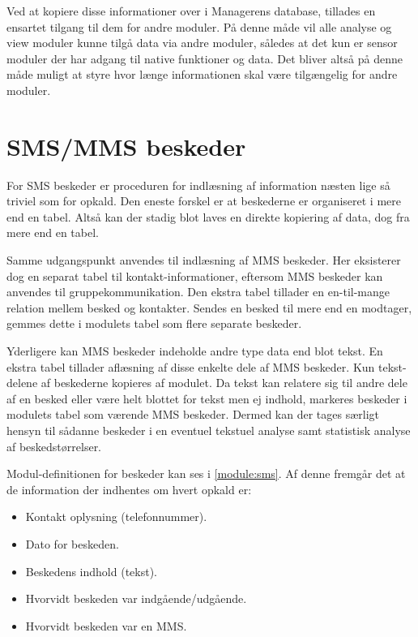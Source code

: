 Ved at kopiere disse informationer over i Managerens database, tillades en ensartet tilgang til dem for andre moduler.
På denne måde vil alle analyse og view moduler kunne tilgå data via andre moduler, således at det kun er sensor moduler der har adgang til native funktioner og data.
Det bliver altså på denne måde muligt at styre hvor længe informationen skal være tilgængelig for andre moduler.



\section{SMS/MMS beskeder}
For SMS beskeder er proceduren for indlæsning af information næsten lige så triviel som for opkald.
Den eneste forskel er at beskederne er organiseret i mere end en tabel.
Altså kan der stadig blot laves en direkte kopiering af data, dog fra mere end en tabel.

Samme udgangspunkt anvendes til indlæsning af MMS beskeder.
Her eksisterer dog en separat tabel til kontakt-informationer, eftersom MMS beskeder kan anvendes til gruppekommunikation.
Den ekstra tabel tillader en en-til-mange relation mellem besked og kontakter.
Sendes en besked til mere end en modtager, gemmes dette i modulets tabel som flere separate beskeder.

Yderligere kan MMS beskeder indeholde andre type data end blot tekst.
En ekstra tabel tillader aflæsning af disse enkelte dele af MMS beskeder.
Kun tekst-delene af beskederne kopieres af modulet.
Da tekst kan relatere sig til andre dele af en besked eller være helt blottet for tekst men ej indhold, markeres beskeder i modulets tabel som værende MMS beskeder.
Dermed kan der tages særligt hensyn til sådanne beskeder i en eventuel tekstuel analyse samt statistisk analyse af beskedstørrelser.

Modul-definitionen for beskeder kan ses i \cref{module:sms}.
Af denne fremgår det at de information der indhentes om hvert opkald er:
\begin{itemize}
\item Kontakt oplysning (telefonnummer).
\item Dato for beskeden.
\item Beskedens indhold (tekst).
\item Hvorvidt beskeden var indgående/udgående.
\item Hvorvidt beskeden var en MMS.
\end{itemize}


